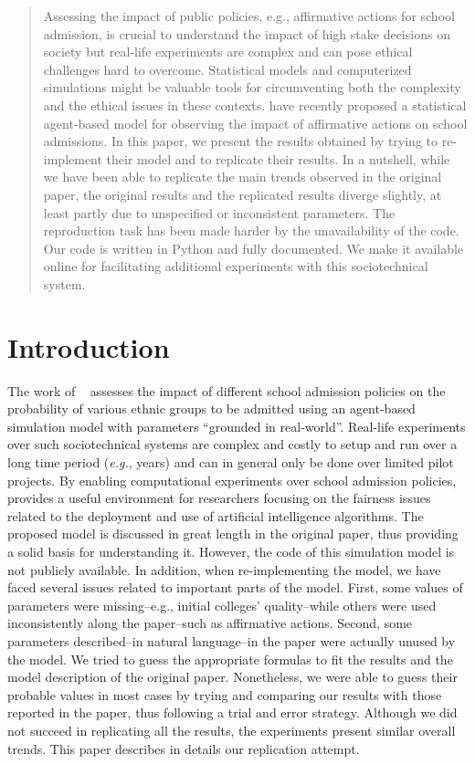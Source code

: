 \begin{abstract}
 Assessing the impact of public policies, e.g., affirmative actions for school admission, is crucial to understand the impact of high stake decisions on society but real‐life experiments are complex and can pose ethical challenges hard to overcome. Statistical models and computerized simulations might be valuable tools for circumventing both the complexity and the ethical issues in these contexts. \citeauthor{reardon2018levels} have recently proposed a statistical agent-based model for observing the impact of affirmative actions on school admissions. In this paper, we present the results obtained by trying to re-implement their model and to replicate their results. In a nutshell, while we have been able to replicate the main trends observed in the original paper, the original results and the replicated results diverge slightly, at least partly due to unspecified or inconsistent parameters. The reproduction task has been made harder by the unavailability of the code. Our code is written in Python and fully documented. We make it available online for facilitating additional experiments with this sociotechnical system.
\end{abstract}

\section{Introduction}

The work of \citeauthor{reardon2018levels}~\cite{reardon2018levels} assesses the impact of different school admission policies on the probability of various ethnic groups to be admitted using an agent-based simulation model with parameters ``grounded in real-world''.
Real-life experiments over such sociotechnical systems are complex and costly to setup and run over a long time period (\emph{e.g.}, years) and can in general only be done over limited pilot projects.
By enabling computational experiments over school admission policies, \citeauthor{reardon2018levels} provides a useful environment for researchers focusing on the fairness issues related to the deployment and use of artificial intelligence algorithms.
The proposed model is discussed in great length in the original paper, thus providing a solid basis for understanding it.
However, the code of this simulation model is not publicly available.
In addition, when re-implementing the model, we have faced several issues related to important parts of the model.
First, some values of parameters were missing--e.g., initial colleges' quality--while others were used inconsistently along the paper--such as affirmative actions.
Second, some parameters described--in natural language--in the paper were actually unused by the model. We tried to guess the appropriate formulas to fit the results and the model description of the original paper.
Nonetheless, we were able to guess their probable values in most cases by trying and comparing our results with those reported in the paper, thus following a trial and error strategy.
Although we did not succeed in replicating all the results, the experiments present similar overall trends.
This paper describes in details our replication attempt.

